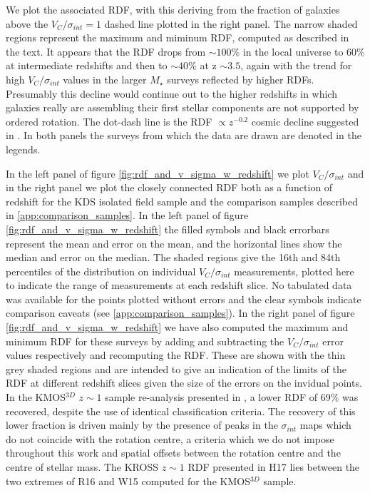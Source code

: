 \documentclass[fleqn,usenatbib]{mn2e}
\begin{document}
\begin{figure*}
{    We plot the associated RDF, with this deriving from the fraction of galaxies above the $V_{C}/\sigma_{int} = 1$ dashed line plotted in the right panel.
    The narrow shaded regions represent the maximum and miminum RDF, computed as described in the text.
    It appears that the RDF drops from $\sim 100\%$ in the local universe to $60\%$ at intermediate redshifts and then to $\sim 40\%$ at z $\sim 3.5$, again with the trend for high $V_{C}/\sigma_{int}$ values in the larger $M_{\star}$ surveys reflected by higher RDFs.
    Presumably this decline would continue out to the higher redshifts in which galaxies really are assembling their first stellar components are not supported by ordered rotation.
    The dot-dash line is the RDF $\propto z^{-0.2}$ cosmic decline suggested in \protect\cite{Stott2016}.
    In both panels the surveys from which the data are drawn are denoted in the legends.
}
    \label{fig:rdf_and_v_sigma_w_redshift}
\end{figure*}

In the left panel of figure \ref{fig:rdf_and_v_sigma_w_redshift} we plot $V_{C}/\sigma_{int}$ and in the right panel we plot the closely connected RDF both as a function of redshift for the KDS isolated field sample and the comparison samples described in \cref{app:comparison_samples}.
In the left panel of figure \ref{fig:rdf_and_v_sigma_w_redshift} the filled symbols and black errorbars represent the mean and error on the mean, and the horizontal lines show the median and error on the median.   
The shaded regions give the 16th and 84th percentiles of the distribution on individual $V_{C}/\sigma_{int}$ measurements, plotted here to indicate the range of measurements at each redshift slice.
No tabulated data was available for the points plotted without errors and the clear symbols indicate comparison caveats (see \cref{app:comparison_samples}).
In the right panel of figure \ref{fig:rdf_and_v_sigma_w_redshift} we have also computed the maximum and minimum RDF for these surveys by adding and subtracting the $V_{C}/\sigma_{int}$ error values respectively and recomputing the RDF.
These are shown with the thin grey shaded regions and are intended to give an indication of the limits of the RDF at different redshift slices given the size of the errors on the invidual points.
In the KMOS$^{3D}$ $z \sim 1$ sample re-analysis presented in \cite{Rodrigues2016}, a lower RDF of 69\% was recovered, despite the use of identical classification criteria.
The recovery of this lower fraction is driven mainly by the presence of peaks in the $\sigma_{int}$ maps which do not coincide with the rotation centre, a criteria which we do not impose throughout this work and spatial offsets between the rotation centre and the centre of stellar mass.
The KROSS $z\sim1$ RDF presented in H17 lies between the two extremes of R16 and W15 computed for the KMOS$^{3D}$ sample. \\
\end{document}
